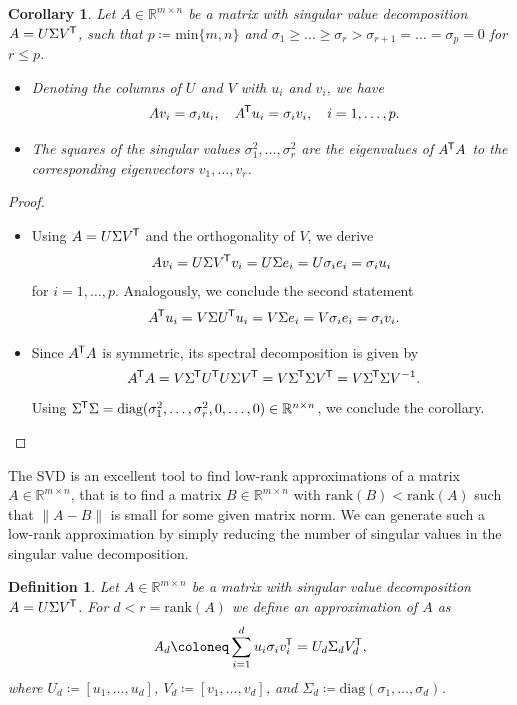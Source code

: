 \documentclass[11pt, a4paper]{article}
\newtheorem{corollary}[theorem]{Corollary}
\newtheorem{definition}[theorem]{Definition}
\newcommand{\R}{\mathbb{R}}
\newcommand*{\tr}{^{\mkern-1.5mu\mathsf{T}}}
\begin{document}
\begin{corollary} \label{cor:svd}
Let $A \in \R^{m \times n}$ be a matrix with singular value decomposition $A=U \Sigma V\tr $, such that $p \coloneq \text{min}\{m,n\}$ and $\sigma_1 \geq \dots \geq \sigma_r > \sigma_{r+1} = \dots = \sigma_p = 0$ for $r \leq p$.
\begin{itemize}
\item[1.] Denoting the columns of $U$ and $V$ with $u_i$ and $v_i$, we have
\[ A v_i = \sigma_i u_i, \quad A\tr  u_i = \sigma_i v_i, \quad i=1,\dots,p.\]
\item[2.] The squares of the singular values $\sigma_1^2, \dots, \sigma_r^2$ are the eigenvalues of $A\tr A$ to the corresponding eigenvectors $v_1, \dots, v_r$.
\end{itemize}
\end{corollary}

\begin{proof}
\ 
\begin{itemize}
\item[1.] Using $A=U \Sigma V\tr $ and the orthogonality of $V$, we derive
\[ Av_i = U \Sigma V\tr  v_i = U \Sigma e_i = U \sigma_i e_i = \sigma_i u_i \]
for $i=1, \dots, p$. Analogously, we conclude the second statement
\[ A\tr  u_i = V \Sigma U\tr  u_i = V \Sigma e_i = V \sigma_i e_i = \sigma_i v_i. \]
\item[2.] Since $A\tr A$ is symmetric, its spectral decomposition is given by
\[ A\tr A = V \Sigma\tr  U\tr  U \Sigma V\tr  = V \Sigma\tr  \Sigma V\tr  = V \Sigma\tr  \Sigma V^{-1}. \]
Using $\Sigma\tr  \Sigma = \text{diag}(\sigma_1^2, \dots, \sigma_r^2, 0, \dots, 0) \in \R^{n \times n}$, we conclude the corollary. \qedhere
\end{itemize}
\end{proof}

The SVD is an excellent tool to find low-rank approximations of a matrix $A \in \R^{m \times n}$, that is to find a matrix $B \in \R^{m \times n}$ with $\text{rank}(B) < \text{rank}(A)$ such that $\|A -B\|$ is small for some given matrix norm. We can generate such a low-rank approximation by simply reducing the number of singular values in the singular value decomposition.

\begin{definition} \label{def:rank}
Let $A \in \R^{m \times n}$ be a matrix with singular value decomposition $A=U \Sigma V\tr $. For $d < r = \text{rank}(A)$ we define an approximation of $A$ as
\[ A_d \coloneq \sum_{i=1}^{d} u_i \sigma_i v_i\tr  = U_d \Sigma_d V_d \tr , \]
where $U_d \coloneq [u_1, \dots, u_d]$, $V_d \coloneq [v_1, \dots, v_d]$, and $\Sigma_d \coloneq \text{diag}(\sigma_1, \dots, \sigma_d)$.
\end{definition}
\end{document}
